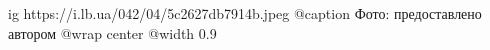  
 
 
 
 

\ifcmt
  ig https://i.lb.ua/042/04/5c2627db7914b.jpeg
	@caption Фото: предоставлено автором
  @wrap center
  @width 0.9
\fi
